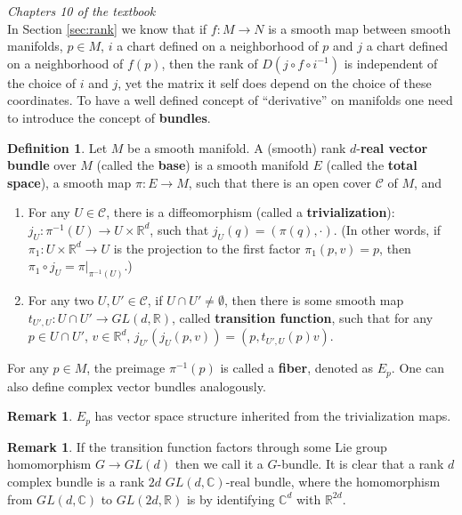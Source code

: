 \documentclass{article}
\theoremstyle{definition}
\newtheorem{dfn}[thm]{Definition}
\newtheorem{rmk}[thm]{Remark}
\begin{document}
{\em Chapters 10 of the textbook}\\

In Section \ref{sec:rank} we know that if $f: M\rightarrow N$ is a smooth map between smooth manifolds, $p\in M$, $i$ a chart defined on a neighborhood of $p$ and $j$ a chart defined on a neighborhood of $f(p)$, then the rank of $D(j\circ f\circ i^{-1})$ is independent of the choice of $i$ and $j$, yet the matrix it self does depend on the choice of these coordinates. To have a well defined concept of ``derivative'' on manifolds one need to introduce the concept of {\bf bundles}.

\begin{dfn}\label{vb}
    Let $M$ be a smooth manifold. A (smooth) rank $d$-{\bf real vector bundle} over $M$ (called the {\bf base}) is a smooth manifold $E$ (called the {\bf total space}), a smooth map $\pi: E\rightarrow M$, such that there is an open cover $\mathcal{C}$ of $M$, and
\begin{enumerate}
    \item For any $U\in\mathcal{C}$, there is a diffeomorphism (called a {\bf trivialization}): $j_U: \pi^{-1}(U)\rightarrow U\times\mathbb{R}^d$, such that $j_U(q)=(\pi(q), \cdot)$. (In other words, if $\pi_1: U\times \mathbb{R}^d\rightarrow U$ is the projection to the first factor $\pi_1(p, v)=p$, then $\pi_1\circ j_U=\pi|_{\pi^{-1}(U)}$.)
    \item For any two $U, U'\in\mathcal{C}$, if $U\cap U'\not=\emptyset$, then there is some smooth map $t_{U', U}: U\cap U'\rightarrow GL(d, \mathbb{R})$, called {\bf transition function}, such that for any $p\in U\cap U'$, $v\in\mathbb{R}^d$, $j_{U'}(j_U(p, v))=(p, t_{U', U}(p)v)$.
\end{enumerate}
  For any $p\in M$, the preimage $\pi^{-1}(p)$ is called a {\bf fiber}, denoted as $E_p$. One can also define complex vector bundles analogously.
\end{dfn}  

\begin{rmk}
    $E_p$ has vector space structure inherited from the trivialization maps.
\end{rmk}

\begin{rmk}
  If the transition function factors through some Lie group homomorphism $G\rightarrow GL(d)$ then we call it a $G$-bundle. It is clear that a rank $d$ complex bundle is a rank $2d$ $GL(d, \mathbb{C})$-real bundle, where the homomorphism from $GL(d, \mathbb{C})$ to $GL(2d, \mathbb{R})$ is by identifying $\mathbb{C}^d$ with $\mathbb{R}^{2d}$.
\end{rmk}
\end{document}
